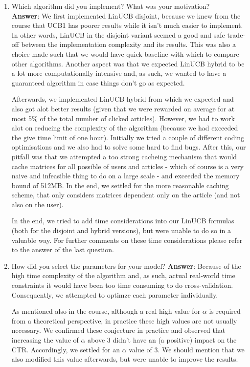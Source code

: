 \documentclass[11pt]{article}
\begin{document}
\begin{enumerate}
\item Which algorithm did you implement? What was your motivation? \\
\textbf{Answer}:
We first implemented LinUCB disjoint, because we knew from the course that UCB1
has poorer results while it isn't much easier to implement. In other words,
LinUCB in the disjoint variant seemed a good and safe trade-off between the
implementation complexity and its results. This was also a choice made such
that we would have quick baseline with which to compare other algorithms.
Another aspect was that we expected LinUCB hybrid to be a lot more
computationally intensive and, as such, we wanted to have a guaranteed
algorithm in case things don't go as expected.

Afterwards, we implemented LinUCB hybrid from which we expected and also got
alot better results (given that we were rewarded on average for at most 5\% of
the total number of clicked articles). However, we had to work alot on reducing
the complexity of the algorithm (because we had exceeded the give time limit of
one hour). Initially we tried a couple of different coding optimisations and we
also had to solve some hard to find bugs. After this, our pitfall was that we
attempted a too strong cacheing mechanism that would cache matrices for all
possible of users and articles - which of course is a very naive and infeasible
thing to do on a large scale - and exceeded the memory bound of 512MB. In the
end, we settled for the more reasonable caching scheme, that only considers
matrices dependent only on the article (and not also on the user).

In the end, we tried to add time considerations into our LinUCB formulas (both
for the disjoint and hybrid versions), but were unable to do so in a valuable
 way. For further comments on these time considerations please refer to the
 answer of the last question.

\item How did you select the parameters for your model?
\textbf{Answer}:
Because of the high time complexity of the algorithm and, as such, actual
real-world time constraints it would have been too time consuming to do
cross-validation. Consequently, we attempted to optimze each parameter
individually.

As mentioned also in the course, although a real high value for $\alpha$ is
required from a theoretical perspective, in practice these high values are not
usually necessary. We confirmed these conjecture in practice and observed that
increasing the value of $\alpha$ above 3 didn't have an (a positive) impact on
the CTR. Accordingly, we settled for an $\alpha$ value of 3. We should mention
that we also modified this value afterwards, but were unable to improve the
results.


\end{enumerate}
\end{document}
